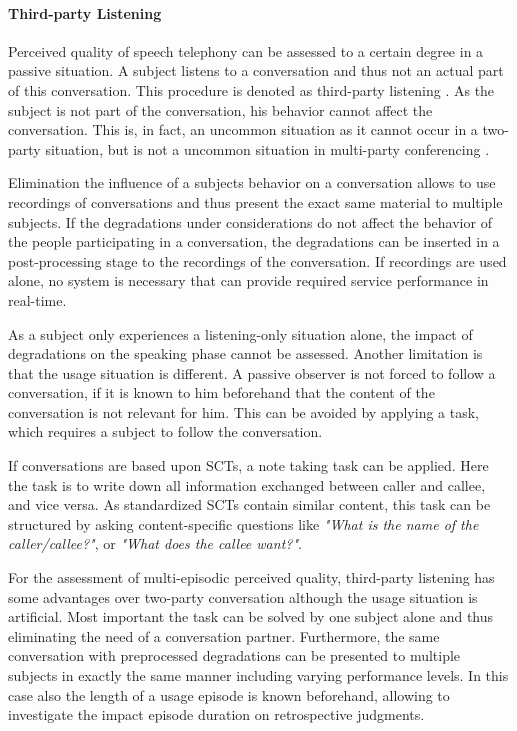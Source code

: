 \paragraph*{Third-party Listening}
Perceived quality of speech telephony can be assessed to a certain degree in a passive situation.
A subject listens to a conversation and thus not an actual part of this conversation.
This procedure is denoted as third-party listening \citep[\cf,][p. 13]{itu-t_p.832:_2000}.
As the subject is not part of the conversation, his behavior cannot affect the conversation.
This is, in fact, an uncommon situation as it cannot occur in a two-party situation, but is not a uncommon situation in multi-party conferencing .

Elimination the influence of a subjects behavior on a conversation allows to use recordings of conversations and thus present the exact same material to multiple subjects.
If the degradations under considerations do not affect the behavior of the people participating in a conversation, the degradations can be inserted in a post-processing stage to the recordings of the conversation.
If recordings are used alone, no system is necessary that can provide required service performance in real-time.

As a subject only experiences a listening-only situation alone, the impact of degradations on the speaking phase cannot be assessed.
Another limitation is that the usage situation is different.
A passive observer is not forced to follow a conversation, if it is known to him beforehand that the content of the conversation is not relevant for him.
This can be avoided by applying a task, which requires a subject to follow the conversation.

If conversations are based upon \acp{SCT}, a note taking task can be applied.
Here the task is to write down all information exchanged between caller and callee, and vice versa.
As standardized \acp{SCT} \citep{itu-t_p.805:_2007} contain similar content, this task can be structured by asking content-specific questions like \emph{"What is the name of the caller/callee?"}, or \emph{"What does the callee want?"}.

For the assessment of multi-episodic perceived quality, third-party listening has some advantages over two-party conversation although the usage situation is artificial.
Most important the task can be solved by one subject alone and thus eliminating the need of a conversation partner.
Furthermore, the same conversation with preprocessed degradations can be presented to multiple subjects in exactly the same manner including varying performance levels.
In this case also the length of a usage episode is known beforehand, allowing to investigate the impact episode duration on retrospective judgments.

